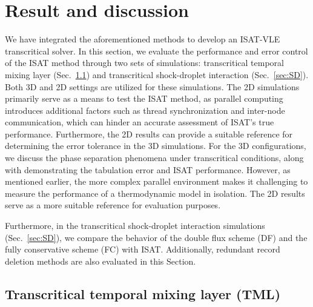 \section{Result and discussion} \label{sec:result}

We have integrated the aforementioned methods to develop an ISAT-VLE transcritical solver. In this section, we evaluate the performance and error control of the ISAT method through two sets of simulations: transcritical temporal mixing layer (Sec.~\ref{sec:TML}) and transcritical shock-droplet interaction (Sec.~\ref{sec:SD}). Both 3D and 2D settings are utilized for these simulations. The 2D simulations primarily serve as a means to test the ISAT method, as parallel computing introduces additional factors such as thread synchronization and inter-node communication, which can hinder an accurate assessment of ISAT's true performance. Furthermore, the 2D results can provide a suitable reference for determining the error tolerance in the 3D simulations. For the 3D configurations, we discuss the phase separation phenomena under transcritical conditions, along with demonstrating the tabulation error and ISAT performance. However, as mentioned earlier, the more complex parallel environment makes it challenging to measure the performance of a thermodynamic model in isolation. The 2D results serve as a more suitable reference for evaluation purposes.

Furthermore, in the transcritical shock-droplet interaction simulations (Sec.~\ref{sec:SD}), we compare the behavior of the double flux scheme (DF) and the fully conservative scheme (FC) with ISAT. Additionally, redundant record deletion methods are also evaluated in this Section.

\subsection{Transcritical temporal mixing layer (TML)}
\label{sec:TML}

